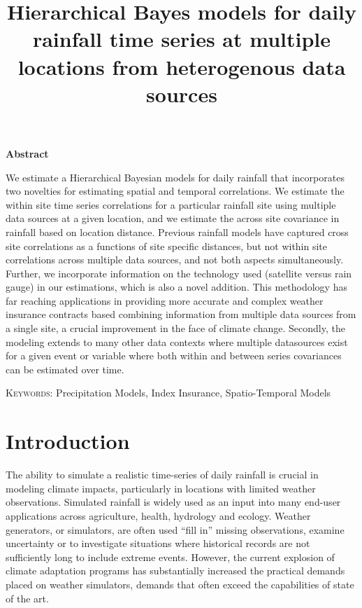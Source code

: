 \documentclass[11pt]{article}
\begin{document}
\title{Hierarchical Bayes models for daily rainfall time series at multiple locations from heterogenous data sources}
\author{}

\maketitle

\newpage
\begin{center}
\textbf{Abstract}
\end{center}
We estimate a Hierarchical Bayesian models for daily rainfall that incorporates two novelties for estimating spatial and temporal correlations. We estimate the within site time series correlations for a particular rainfall site using multiple data sources at a given location, and we estimate the across site covariance in rainfall based on location distance. Previous rainfall models have captured cross site correlations as a functions of site specific distances, but not within site correlations across multiple data sources, and not both aspects simultaneously. Further, we incorporate information on the technology used (satellite versus rain gauge) in our estimations, which is also a novel addition. This methodology has far reaching applications in providing more accurate and complex weather insurance contracts based combining information from multiple data sources from a  single site,  a crucial improvement in the face of climate change. Secondly, the modeling extends to many other data contexts where multiple datasources exist for a given event or variable where both within and between series covariances can be estimated over time.

\vspace*{.3in}

\noindent\textsc{Keywords}: {Precipitation Models, Index Insurance, Spatio-Temporal Models}

\newpage

\section{Introduction}\label{sec:intro}

The ability to simulate a realistic time-series of daily rainfall is crucial in modeling climate impacts, particularly in locations with limited weather observations.   Simulated rainfall is widely used as an input into many end-user applications across agriculture, health, hydrology and ecology.  Weather generators, or simulators, are often used ``fill in'' missing observations, examine uncertainty or to investigate situations where historical records are not sufficiently long to include extreme events.   However, the current explosion of climate adaptation programs has substantially increased the practical demands placed on weather simulators, demands that often exceed the capabilities of state of the art.  
\end{document}
